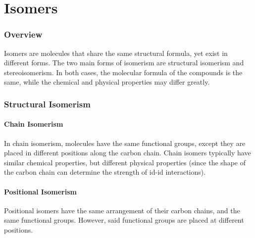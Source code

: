 

\pagebreak
\hypertarget{ChapterIsomers}{}
\part{Isomers}

	\section{Overview}

	Isomers are molecules that share the same structural formula, yet exist in different forms. The two main
	forms of isomerism are structural isomerism and stereoisomerism. In both cases, the molecular formula of the
	compounds is the same, while the chemical and physical properties may differ greatly.


	\section{Structural Isomerism}

		\subsection{Chain Isomerism}

			In chain isomerism, molecules have the same functional groups, except they are placed in different positions
			along the carbon chain. Chain isomers typically have similar chemical properties, but different physical
			properties (since the shape of the carbon chain can determine the strength of id-id interactions).





		\pagebreak
		\subsection{Positional Isomerism}
			Positional isomers have the same arrangement of their carbon chains, and the same functional groups. However, said
			functional groups are placed at different positions.


